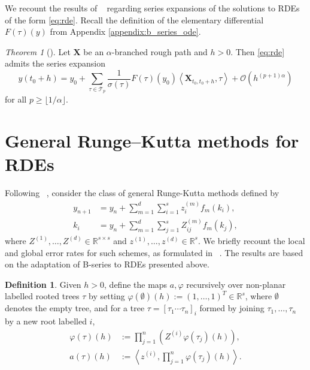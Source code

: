 \documentclass{article} %
\theoremstyle{definition}
\newtheorem{definition}{Definition}[section]
\theoremstyle{remark}
\newtheorem{theorem}{Theorem}[section]
\begin{document}
We recount the results of ~\citep{redmann2020runge} regarding series expansions of the solutions to RDEs of the form \eqref{eq:rde}. Recall the definition of the elementary differential $F(\tau)(y)$ from Appendix \ref{appendix:b_series_ode}.

\begin{theorem}[{\cite[Theorem 2.10]{redmann2020runge}}]
    Let $\mathbf{X}$ be an $\alpha$-branched rough path and $h > 0$. Then \eqref{eq:rde} admits the series expansion
    \begin{equation*}
        y(t_0 + h) = y_0 + \sum_{\tau \in \mathcal{T}_p} \frac{1}{\sigma(\tau)} F(\tau)(y_0) \left<\mathbf{X}_{t_0, t_0 + h}, \tau\right> + \mathcal{O}(h^{(p+1) \alpha})
    \end{equation*}
    for all $p \geq \lfloor 1 / \alpha \rfloor$.
\end{theorem}

\section{General Runge--Kutta methods for RDEs} \label{appendix:general_rk}

Following ~\cite{burrage1996high, burrage1998general, burrage2000order, redmann2020runge}, consider the class of general Runge-Kutta methods defined by
\begin{align}\label{eq:full_rk}
    y_{n+1} &= y_n + \sum_{m=1}^d \sum_{i=1}^s z_i^{(m)} f_m(k_i),\\
    k_i &= y_n + \sum_{m=1}^d \sum_{j=1}^s Z^{(m)}_{ij} f_m(k_j),\nonumber
\end{align}
where $Z^{(1)}, \ldots, Z^{(d)} \in \mathbb{R}^{s \times s}$ and $z^{(1)}, \ldots, z^{(d)} \in \mathbb{R}^s$. We briefly recount the local and global error rates for such schemes, as formulated in ~\cite{redmann2020runge}. The results are based on the adaptation of B-series to RDEs presented above.

\begin{definition}
    Given $h > 0$, define the maps $a, \varphi$ recursively over non-planar labelled rooted trees $\tau$ by setting $\varphi(\emptyset)(h) := (1,\ldots,1)^T \in \mathbb{R}^s$, where $\emptyset$ denotes the empty tree, and for a tree $\tau = [\tau_1 \cdots \tau_n]_i$ formed by joining $\tau_1, \ldots, \tau_n$ by a new root labelled $i$,
    \begin{align*}
        \varphi(\tau)(h) &:= \prod_{j=1}^n (Z^{(i)} \varphi(\tau_j)(h)),\\
        a(\tau)(h) &:= \left< z^{(i)}, \prod_{j=1}^n \varphi(\tau_j)(h)\right>.
    \end{align*}
\end{definition}
\end{document}
